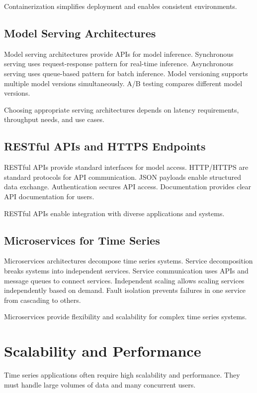 Containerization simplifies deployment and enables consistent environments.

\subsection{Model Serving Architectures}

Model serving architectures provide APIs for model inference. Synchronous serving uses request-response pattern for real-time inference. Asynchronous serving uses queue-based pattern for batch inference. Model versioning supports multiple model versions simultaneously. A/B testing compares different model versions.

Choosing appropriate serving architectures depends on latency requirements, throughput needs, and use cases.

\subsection{RESTful APIs and HTTPS Endpoints}

RESTful APIs provide standard interfaces for model access. HTTP/HTTPS are standard protocols for API communication. JSON payloads enable structured data exchange. Authentication secures API access. Documentation provides clear API documentation for users.

RESTful APIs enable integration with diverse applications and systems.

\subsection{Microservices for Time Series}

Microservices architectures decompose time series systems. Service decomposition breaks systems into independent services. Service communication uses APIs and message queues to connect services. Independent scaling allows scaling services independently based on demand. Fault isolation prevents failures in one service from cascading to others.

Microservices provide flexibility and scalability for complex time series systems.

\section{Scalability and Performance}

Time series applications often require high scalability and performance. They must handle large volumes of data and many concurrent users.

